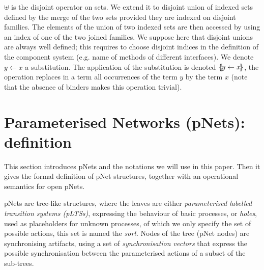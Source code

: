 \documentclass{lncs/llncs}
\newcommand{\LUDO}[1]{\textcolor{darkgreen}{#1}}
\begin{document}
$\uplus$ is the disjoint operator on sets. We extend it to  disjoint union  of indexed 
sets defined by the merge of the 
two sets provided they are indexed on disjoint families.
The elements
of the union of two indexed sets are then accessed by using an index of one of the two
joined families.
We suppose here that disjoint unions are always well defined; this
requires to choose disjoint  
indices in the definition of the component system (e.g. name of
methods of different interfaces).
We denote $y\gets x$ a substitution. The application of the substitution is denoted
$\{\hspace{-0.88ex}\{\!y\gets x\!\}\hspace{-0.87ex}\}$, the operation replaces in a term all occurrences 
of the term $y$ by the term $x$ (note that the absence of binders makes this operation 
trivial).

\section{Parameterised Networks (pNets): definition}
\label{section:pnets}

This section introduces pNets and the notations we will use in
this paper. Then it gives the formal definition of pNet structures,
together with an operational semantics for open pNets.

pNets are tree-like structures, where the leaves are either
\emph{parameterised labelled transition systems (pLTSs)}, expressing the
behaviour of basic processes, or \emph{holes}, used as placeholders
for unknown processes, of which we only specify the set of possible
actions, this set is named the \emph{sort}.
Nodes of the tree (pNet nodes) are synchronising artifacts, using a
set of \emph{synchronisation vectors} that express the possible
synchronisation between the parameterised actions of a subset of the
sub-trees.


\end{document}
